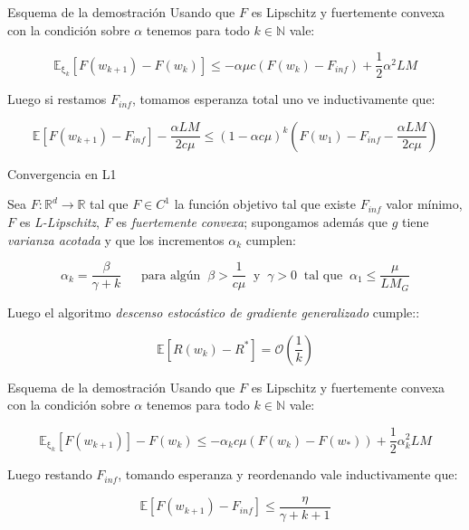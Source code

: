 \documentclass{beamer}
\newcommand{\R}{{\mathbb{R}}}
\newcommand{\N}{{\mathbb{N}}}
\newcommand{\expectation}[1]{\mathbb{E} \left[#1\right]}
\newcommand{\expectationsub}[2]{\mathbb{E}_{#1} \left[#2\right]}
\newcommand{\expectationchik}[1]{\expectationsub{\upxi_{k}}{#1}}
\begin{document}
\begin{frame}{Esquema de la demostraci\'on}
	Usando que $F$ es Lipschitz y fuertemente convexa con la condici\'on sobre $\alpha$ tenemos para todo $k \in \N$ vale:

\begin{equation*}
\expectationchik{F(w_{k+1}) - F(w_k)} \leq - \alpha \mu c \left(F(w_k) - F_{inf} \right)+ \frac{1}{2} \alpha ^2 LM 
\end{equation*}

Luego si restamos $F_{inf}$, tomamos esperanza total uno ve inductivamente que:

\begin{equation*}
\expectation{F(w_{k+1}) - F_{inf}} - \dfrac{\alpha L M}{2 c \mu } \leq \left(1 - \alpha c \mu \right)^{k} \left(F(w_1) - F_{inf} - \dfrac{\alpha LM}{2 c \mu} \right)
\end{equation*}
\end{frame}

\begin{frame}{Convergencia en L1}

\begin{theorem}
	Sea $F: \R^d \rightarrow \R$ tal que $F \in C^1$ la funci\'on objetivo tal que existe $F_{inf}$ valor m\'inimo, $F$ es \textit{L-Lipschitz}, $F$ es \textit{fuertemente convexa}; supongamos adem\'as que $g$ tiene \textit{varianza acotada} y que los incrementos $\alpha_k$ cumplen:
	
	\begin{equation*}
	\alpha_k =  \dfrac{\beta}{\gamma + k} \quad \ \text{ para alg\'un } \ \beta > \frac{1}{c \mu} \  \text{ y } \ \gamma > 0 \  \text{ tal que } \ \alpha_1 \leq \dfrac{\mu}{L M_G} 
	\end{equation*}
	
	Luego el algoritmo \textit{descenso estoc\'astico de gradiente generalizado} cumple::
	
	\begin{equation*}
	\expectation{R(w_k) - R^*} = \mathcal{O} \left(\frac{1}{k}\right)
	\end{equation*}
	
\end{theorem}
\end{frame}

\begin{frame}{Esquema de la demostraci\'on}
	Usando que $F$ es Lipschitz y fuertemente convexa con la condici\'on sobre $\alpha$ tenemos para todo $k \in \N$ vale:

\begin{equation*}
\expectationchik{F(w_{k+1})} - F(w_k) \leq  - \alpha_k c \mu \left(F(w_k) - F(w_*)\right) + \frac{1}{2} \alpha_k^2 L M
\end{equation*}

Luego restando $F_{inf}$, tomando esperanza y reordenando vale inductivamente que:

\begin{equation*}
\expectation{F(w_{k+1}) - F_{inf}} \leq \dfrac{\eta}{\gamma + k + 1}
\end{equation*}
\end{frame}
\end{document}
